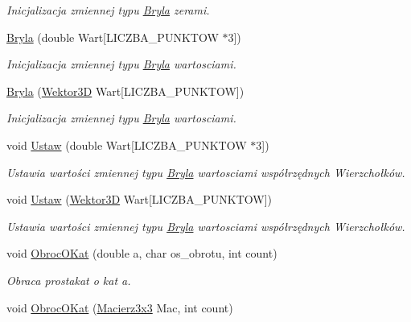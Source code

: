 \begin{DoxyCompactItemize}
\begin{DoxyCompactList}\small\item\em Inicjalizacja zmiennej typu \hyperlink{class_bryla}{Bryla} zerami. \end{DoxyCompactList}\item 
\hyperlink{class_bryla_afb7a04c4b622d9db9119d1a69bc9985b}{Bryla} (double Wart\mbox{[}L\+I\+C\+Z\+B\+A\+\_\+\+P\+U\+N\+K\+T\+O\+W $\ast$3\mbox{]})
\begin{DoxyCompactList}\small\item\em Inicjalizacja zmiennej typu \hyperlink{class_bryla}{Bryla} wartosciami. \end{DoxyCompactList}\item 
\hyperlink{class_bryla_a0aefe6e9e5325a72d3578b254e4253c3}{Bryla} (\hyperlink{class_wektor3_d}{Wektor3\+D} Wart\mbox{[}L\+I\+C\+Z\+B\+A\+\_\+\+P\+U\+N\+K\+T\+O\+W\mbox{]})
\begin{DoxyCompactList}\small\item\em Inicjalizacja zmiennej typu \hyperlink{class_bryla}{Bryla} wartosciami. \end{DoxyCompactList}\item 
void \hyperlink{class_bryla_a393c921d51e8d970f199c2ae509d8436}{Ustaw} (double Wart\mbox{[}L\+I\+C\+Z\+B\+A\+\_\+\+P\+U\+N\+K\+T\+O\+W $\ast$3\mbox{]})
\begin{DoxyCompactList}\small\item\em Ustawia wartości zmiennej typu \hyperlink{class_bryla}{Bryla} wartosciami współrzędnych Wierzchołków. \end{DoxyCompactList}\item 
void \hyperlink{class_bryla_a380e7b2d09b074851c4b6bdb30d35a11}{Ustaw} (\hyperlink{class_wektor3_d}{Wektor3\+D} Wart\mbox{[}L\+I\+C\+Z\+B\+A\+\_\+\+P\+U\+N\+K\+T\+O\+W\mbox{]})
\begin{DoxyCompactList}\small\item\em Ustawia wartości zmiennej typu \hyperlink{class_bryla}{Bryla} wartosciami współrzędnych Wierzchołków. \end{DoxyCompactList}\item 
void \hyperlink{class_bryla_a4b9ee3443c7bfb832b6a57c22c74d93d}{Obroc\+O\+Kat} (double a, char os\+\_\+obrotu, int count)
\begin{DoxyCompactList}\small\item\em Obraca prostakat o kat a. \end{DoxyCompactList}\item 
void \hyperlink{class_bryla_aa4f8d13cdd46139ec61a08e36ac5916b}{Obroc\+O\+Kat} (\hyperlink{class_macierz3x3}{Macierz3x3} Mac, int count)

\end{DoxyCompactItemize}
